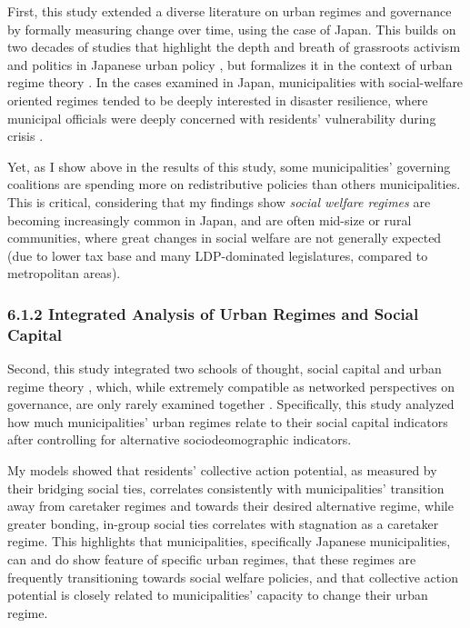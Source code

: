 \documentclass[preprint, 3p,
authoryear]{elsarticle} %
\begin{document}
First, this study extended a diverse literature on urban regimes and
governance by formally measuring change over time, using the case of
Japan. This builds on two decades of studies that highlight the depth
and breath of grassroots activism and politics in Japanese urban policy
\citep[eg.][]{leblanc_1999, funck_2007, leblanc_2009, avenell_2010, aldrich_and_fraser_2017},
but formalizes it in the context of urban regime theory
\citep{stone_1989}. In the cases examined in Japan, municipalities with
social-welfare oriented regimes tended to be deeply interested in
disaster resilience, where municipal officials were deeply concerned
with residents' vulnerability during crisis
\citep{maly_2012, aldrich_2012, dimmer_and_lindenberg_2014, matthews_2017, aldrich_2019, cheek_2020, ji_and_imai_2022, abeysinghe_2022}.

Yet, as I show above in the results of this study, some municipalities'
governing coalitions are spending more on redistributive policies than
others municipalities. This is critical, considering that my findings
show \emph{social welfare regimes} are becoming increasingly common in
Japan, and are often mid-size or rural communities, where great changes
in social welfare are not generally expected (due to lower tax base and
many LDP-dominated legislatures, compared to metropolitan areas).

\hypertarget{integrated-analysis-of-urban-regimes-and-social-capital}{%
\subsubsection{6.1.2 Integrated Analysis of Urban Regimes and Social
Capital}\label{integrated-analysis-of-urban-regimes-and-social-capital}}

Second, this study integrated two schools of thought, social capital
\citep{putnam_2000, woolcock_2010, aldrich_2012, alcorta_et_al_2020, fraser_2021_IJDRR}
and urban regime theory \citep{stone_1993, stoker_and_mossberger_1994},
which, while extremely compatible as networked perspectives on
governance, are only rarely examined together \citep{fraser_et_al_2020}.
Specifically, this study analyzed how much municipalities' urban regimes
relate to their social capital indicators after controlling for
alternative sociodeomographic indicators.

My models showed that residents' collective action potential, as
measured by their bridging social ties, correlates consistently with
municipalities' transition away from caretaker regimes and towards their
desired alternative regime, while greater bonding, in-group social ties
correlates with stagnation as a caretaker regime. This highlights that
municipalities, specifically Japanese municipalities, can and do show
feature of specific urban regimes, that these regimes are frequently
transitioning towards social welfare policies, and that collective
action potential is closely related to municipalities' capacity to
change their urban regime.
\end{document}
